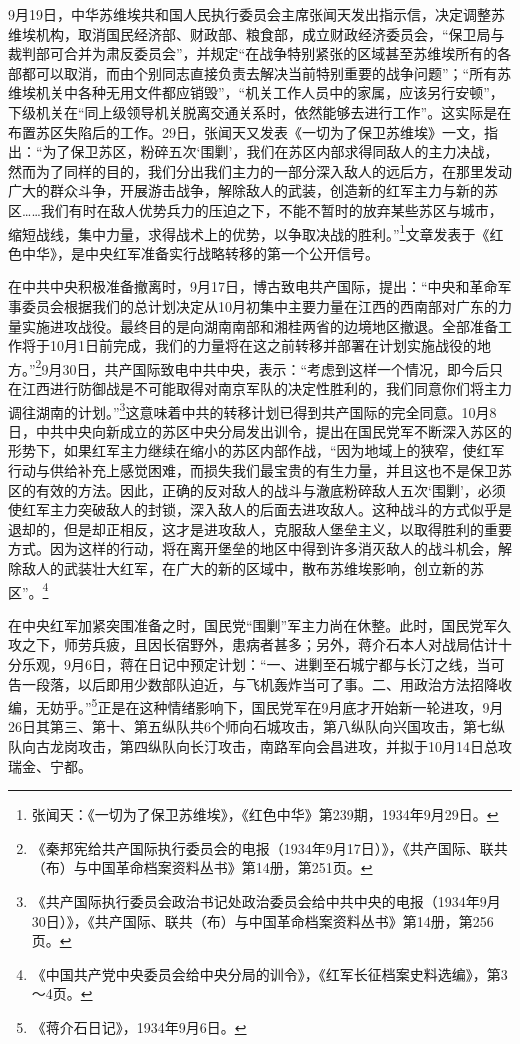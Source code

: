9月19日，中华苏维埃共和国人民执行委员会主席张闻天发出指示信，决定调整苏维埃机构，取消国民经济部、财政部、粮食部，成立财政经济委员会，“保卫局与裁判部可合并为肃反委员会”，并规定“在战争特别紧张的区域甚至苏维埃所有的各部都可以取消，而由个别同志直接负责去解决当前特别重要的战争问题”；“所有苏维埃机关中各种无用文件都应销毁”，“机关工作人员中的家属，应该另行安顿”，下级机关在“同上级领导机关脱离交通关系时，依然能够去进行工作”。这实际是在布置苏区失陷后的工作。29日，张闻天又发表《一切为了保卫苏维埃》一文，指出：“为了保卫苏区，粉碎五次‘围剿’，我们在苏区内部求得同敌人的主力决战，然而为了同样的目的，我们分出我们主力的一部分深入敌人的远后方，在那里发动广大的群众斗争，开展游击战争，解除敌人的武装，创造新的红军主力与新的苏区……我们有时在敌人优势兵力的压迫之下，不能不暂时的放弃某些苏区与城市，缩短战线，集中力量，求得战术上的优势，以争取决战的胜利。”\footnote{张闻天：《一切为了保卫苏维埃》，《红色中华》第239期，1934年9月29日。}文章发表于《红色中华》，是中央红军准备实行战略转移的第一个公开信号。


在中共中央积极准备撤离时，9月17日，博古致电共产国际，提出：“中央和革命军事委员会根据我们的总计划决定从10月初集中主要力量在江西的西南部对广东的力量实施进攻战役。最终目的是向湖南南部和湘桂两省的边境地区撤退。全部准备工作将于10月1日前完成，我们的力量将在这之前转移并部署在计划实施战役的地方。”\footnote{《秦邦宪给共产国际执行委员会的电报（1934年9月17日）》，《共产国际、联共（布）与中国革命档案资料丛书》第14册，第251页。}9月30日，共产国际致电中共中央，表示：“考虑到这样一个情况，即今后只在江西进行防御战是不可能取得对南京军队的决定性胜利的，我们同意你们将主力调往湖南的计划。”\footnote{《共产国际执行委员会政治书记处政治委员会给中共中央的电报（1934年9月30日）》，《共产国际、联共（布）与中国革命档案资料丛书》第14册，第256页。}这意味着中共的转移计划已得到共产国际的完全同意。10月8日，中共中央向新成立的苏区中央分局发出训令，提出在国民党军不断深入苏区的形势下，如果红军主力继续在缩小的苏区内部作战，“因为地域上的狭窄，使红军行动与供给补充上感觉困难，而损失我们最宝贵的有生力量，并且这也不是保卫苏区的有效的方法。因此，正确的反对敌人的战斗与澈底粉碎敌人五次‘围剿’，必须使红军主力突破敌人的封锁，深入敌人的后面去进攻敌人。这种战斗的方式似乎是退却的，但是却正相反，这才是进攻敌人，克服敌人堡垒主义，以取得胜利的重要方式。因为这样的行动，将在离开堡垒的地区中得到许多消灭敌人的战斗机会，解除敌人的武装壮大红军，在广大的新的区域中，散布苏维埃影响，创立新的苏区”。\footnote{《中国共产党中央委员会给中央分局的训令》，《红军长征档案史料选编》，第3～4页。}


在中央红军加紧突围准备之时，国民党“围剿”军主力尚在休整。此时，国民党军久攻之下，师劳兵疲，且因长宿野外，患病者甚多；另外，蒋介石本人对战局估计十分乐观，9月6日，蒋在日记中预定计划：“一、进剿至石城宁都与长汀之线，当可告一段落，以后即用少数部队迫近，与飞机轰炸当可了事。二、用政治方法招降收编，无妨乎。”\footnote{《蒋介石日记》，1934年9月6日。}正是在这种情绪影响下，国民党军在9月底才开始新一轮进攻，9月26日其第三、第十、第五纵队共6个师向石城攻击，第八纵队向兴国攻击，第七纵队向古龙岗攻击，第四纵队向长汀攻击，南路军向会昌进攻，并拟于10月14日总攻瑞金、宁都。



